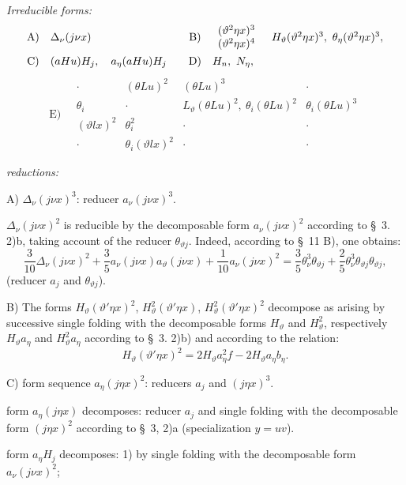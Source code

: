 \documentclass[11pt]{article}
\newcommand{\A}{\Delta}
\begin{document}
\noindent\emph{Irreducible forms:}
\[
\begin{array}{c@{\quad}l@{\qquad}c@{\quad}l}
\text{A)}&\A_\nu(j\nu x)&
\text{B)}&\begin{array}{c}(\vartheta^2\eta x)^3\\(\vartheta^2\eta x)^4\end{array}
\quad H_\vartheta(\vartheta^2\eta x)^3,
\ \theta_\eta(\vartheta^2\eta x)^3,\\[1em]
\text{C)}&(aHu)H_j,
\quad a_\eta(aHu)H_j&
\text{D)}&H_n,
\ N_\eta,
\end{array}
\]
\[
\text{E)}\quad
\begin{array}{c|c|c|c}
\cdot&(\theta Lu)^2&(\theta Lu)^3&\cdot\\
\theta_i&\cdot&L_\vartheta(\theta Lu)^2,
\ \theta_i(\theta Lu)^2&\theta_i(\theta Lu)^3\\
(\vartheta lx)^2&\theta_i^2&\cdot&\cdot\\
\cdot&\theta_i(\vartheta lx)^2&\cdot&\cdot
\end{array}
\]

\noindent\emph{reductions:}

\noindent A) $\A_\nu(j\nu x)^3$: reducer $a_\nu(j\nu x)^3$.

$\A_\nu(j\nu x)^2$ is reducible by the decomposable form $a_\nu(j\nu x)^2$ according to \S\ 3. 2)b, taking account of the reducer $\theta_{\vartheta j}$. Indeed, according to \S\ 11 B), one obtains:
\[
\frac3{10}\A_\nu(j\nu x)^2+\frac35a_\nu(j\nu x)a_\vartheta(j\nu x)
+\frac1{10}a_\nu(j\nu x)^2
=\frac35\theta_\nu^3\theta_{\vartheta j}+\frac25\theta_\nu^3\theta_{\vartheta j}\theta_{\vartheta j},
\]
(reducer $a_j$ and $\theta_{\vartheta j}$).

\noindent B) The forms $H_\vartheta(\vartheta'\eta x)^2$, $H_\vartheta^2(\vartheta'\eta x)$, $H_\vartheta^2(\vartheta'\eta x)^2$ decompose as arising by successive single folding with the decomposable forms $H_\vartheta$ and $H_\vartheta^2$, respectively $H_\vartheta a_\eta$ and $H_\vartheta^2a_\eta$ according to \S\ 3. 2)b) and according to the relation:
\[
H_\vartheta(\vartheta'\eta x)^2=2H_\vartheta a_\eta^2f-2H_\vartheta a_\eta b_\eta.
\]

\noindent C) form sequence $a_\eta(j\eta x)^2$: reducers $a_j$ and $(j\eta x)^3$.

form $a_\eta(j\eta x)$ decomposes: reducer $a_j$ and single folding with the decomposable form $(j\eta x)^2$ according to \S\ 3, 2)a (specialization $y=uv$).

form $a_\eta H_j$ decomposes: 1) by single folding with the decomposable form $a_\nu(j\nu x)^2$;
\end{document}
